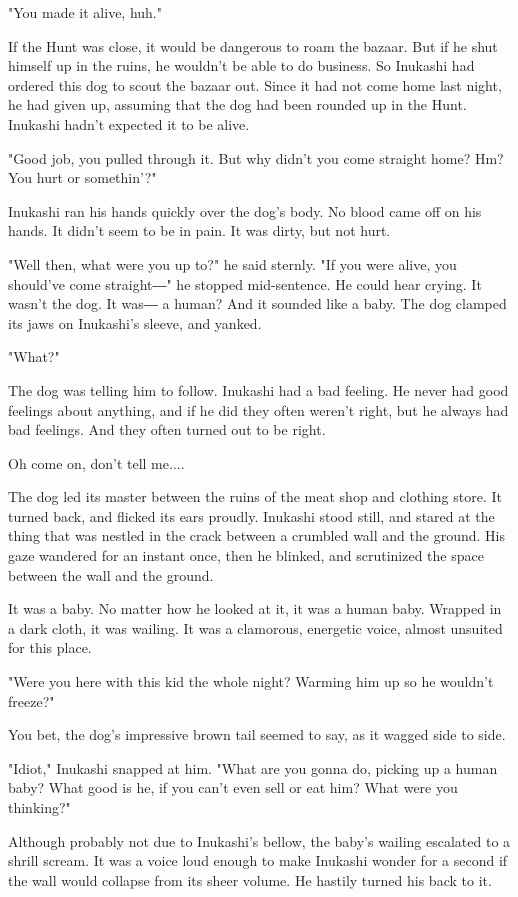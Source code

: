 "You made it alive, huh."

If the Hunt was close, it would be dangerous to roam the bazaar. But if
he shut himself up in the ruins, he wouldn't be able to do business. So
Inukashi had ordered this dog to scout the bazaar out. Since it had not
come home last night, he had given up, assuming that the dog had been
rounded up in the Hunt. Inukashi hadn't expected it to be alive.

"Good job, you pulled through it. But why didn't you come straight home?
Hm? You hurt or somethin'?"

Inukashi ran his hands quickly over the dog's body. No blood came off on
his hands. It didn't seem to be in pain. It was dirty, but not hurt.

"Well then, what were you up to?" he said sternly. "If you were alive,
you should've come straight―" he stopped mid-sentence. He could hear
crying. It wasn't the dog. It was― a human? And it sounded like a baby.
The dog clamped its jaws on Inukashi's sleeve, and yanked.

"What?"

The dog was telling him to follow. Inukashi had a bad feeling. He never
had good feelings about anything, and if he did they often weren't
right, but he always had bad feelings. And they often turned out to be
right.

Oh come on, don't tell me....

The dog led its master between the ruins of the meat shop and clothing
store. It turned back, and flicked its ears proudly. Inukashi stood
still, and stared at the thing that was nestled in the crack between a
crumbled wall and the ground. His gaze wandered for an instant once,
then he blinked, and scrutinized the space between the wall and the
ground.

It was a baby. No matter how he looked at it, it was a human baby.
Wrapped in a dark cloth, it was wailing. It was a clamorous, energetic
voice, almost unsuited for this place.

"Were you here with this kid the whole night? Warming him up so he
wouldn't freeze?"

You bet, the dog's impressive brown tail seemed to say, as it wagged
side to side.

"Idiot," Inukashi snapped at him. "What are you gonna do, picking up a
human baby? What good is he, if you can't even sell or eat him? What
were you thinking?"

Although probably not due to Inukashi's bellow, the baby's wailing
escalated to a shrill scream. It was a voice loud enough to make
Inukashi wonder for a second if the wall would collapse from its sheer
volume. He hastily turned his back to it.

